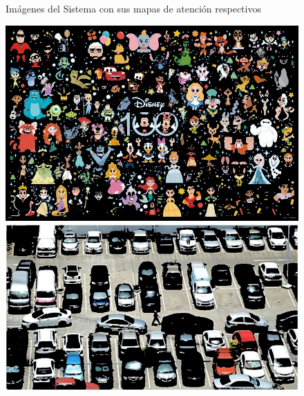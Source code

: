\begin{figure}[H]
\begin{minipage}[b]{0.3\textwidth}
	\end{minipage}
	\caption{Imágenes del Sistema con sus mapas de atenci\'on respectivos }
	\label{fig:saliency-map}
\end{figure}

\begin{figure}[H]
	\centering
	\begin{minipage}[b]{0.3\textwidth}
		\centering
		\includegraphics[width=\textwidth]{Graphics/disney-selected-regions.jpg}
	\end{minipage}
	\hfill
	\begin{minipage}[b]{0.3\textwidth}
		\centering
		\includegraphics[width=\textwidth]{Graphics/cars-selected-regions.jpg}
	\end{minipage}
	\hfill
	\begin{minipage}[b]{0.3\textwidth}
		\centering

\end{minipage}
\end{figure}
